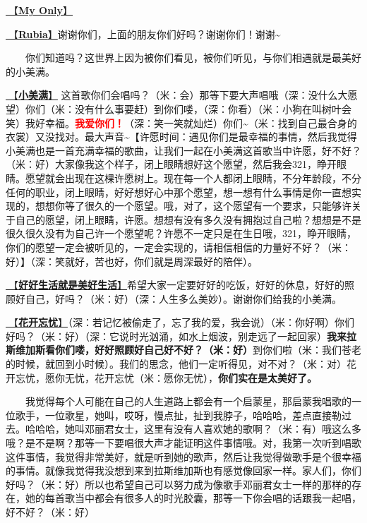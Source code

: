 \documentclass[]{ctexbook}
\begin{document}
\hyperref[my-only]{🎵【\textbf{My Only}】}

\hyperref[rubia]{🎵【\textbf{Rubia}】}谢谢你们，上面的朋友你们好吗？谢谢你们！谢谢\textasciitilde{}

  你们知道吗？这世界上因为被你们看见，被你们听见，与你们相遇就是最美好的小美满。

\hyperref[happy-ending]{🎵【\textbf{小美满}】} 这首歌你们会唱吗？（米：会）那等下要大声唱哦（深：没什么大愿望）你们（米：没有什么事要赶）到你们喽，（深：你看）（米：小狗在叫树叶会笑）我好幸福。\textbf{\textcolor{red}{我爱你们！}}（深：笑一笑就灿烂）你们\textasciitilde（米：找到自己最合身的衣裳）又没找对。最大声音\textasciitilde【许愿时间：遇见你们是最幸福的事情，然后我觉得小美满也是一首充满幸福的歌曲，让我们一起在小美满这首歌当中许愿，好不好？（米：好）大家像我这个样子，闭上眼睛想好这个愿望，然后我会321，睁开眼睛。愿望就会出现在这棵许愿树上。现在每一个人都闭上眼睛，不分年龄段，不分任何的职业，闭上眼睛，好好想好心中那个愿望，想一想有什么事情是你一直想实现的，想想你等了很久的一个愿望。哦，对了，这个愿望有一个要求，只能够许关于自己的愿望，闭上眼睛，许愿。想想有没有多久没有拥抱过自己啦？想想是不是很久很久没有为自己许一个愿望呢？许愿不一定只是在生日哦，321，睁开眼睛，你们的愿望一定会被听见的，一定会实现的，请相信相信的力量好不好？（米：好）】（深：笑就好，苦也好，你们就是周深最好的陪伴）。

\hyperref[live-happy-life-happy]{🎵【\textbf{好好生活就是美好生活}】}希望大家一定要好好的吃饭，好好的休息，好好的照顾好自己，好吗？（米：好）（深：人生多么美妙）。谢谢你们给我的小美满。

\hyperref[no-worries]{🎵【\textbf{花开忘忧}】}（深：若记忆被偷走了，忘了我的爱，我会说）（米：你好啊）你们好吗？（米：好）（深：它说时光汹涌，如水上烟波，别走远了一起回家）\textbf{我来拉斯维加斯看你们喽，好好照顾好自己好不好？（米：好）}到你们啦（米：我们苍老的时候，就回到小时候）。我们的思念，他们一定听得见，对不对？（米：对）花开忘忧，愿你无忧，花开忘忧（米：愿你无忧），\textbf{你们实在是太美好了。}

  我觉得每个人可能在自己的人生道路上都会有一个启蒙星，那启蒙我唱歌的一位歌手，一位歌星，她叫，哎呀，慢点扯，扯到我脖子，哈哈哈，差点直接勒过去。哈哈哈，她叫邓丽君女士，这里有没有人喜欢她的歌啊？（米：有）哦这么多哦？是不是啊？那等一下要唱很大声才能证明这件事情哦。对，我第一次听到唱歌这件事情，我觉得非常美好，就是听到她的歌声，然后让我觉得做歌手是个很幸福的事情。就像我觉得我没想到来到拉斯维加斯也有感觉像回家一样。家人们，你们好吗？（米：好）所以也希望自己可以努力成为像歌手邓丽君女士一样的那样的存在，她的每首歌当中都会有很多人的时光胶囊，那等一下你会唱的话跟我一起唱，好不好？（米：好）
\end{document}
